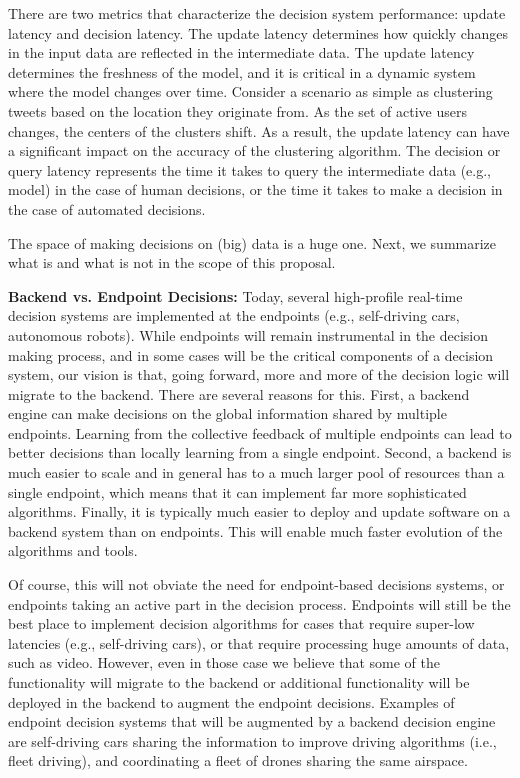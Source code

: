 There are two metrics that characterize the decision system performance: update latency and decision latency. The update latency determines how quickly changes in the input data are reflected in the intermediate data. The update latency determines the freshness of the model, and it is critical in a dynamic system where the model changes over time. Consider a scenario as simple as clustering tweets based on the location they originate from. As the set of active users changes, the centers of the clusters shift. As a result, the update latency can have a significant impact on the accuracy of the clustering algorithm. The decision or query latency represents the time it takes to query the intermediate data (e.g., model) in the case of human decisions, or the time it takes to make a decision in the case of automated decisions.


The space of making decisions on (big) data is a huge one. Next, we summarize what is and what is not in the scope of this proposal.

{\bf Backend vs. Endpoint Decisions:} Today, several high-profile real-time decision systems are implemented at the endpoints (e.g., self-driving cars, autonomous robots). While endpoints will remain instrumental in the decision making process, and in some cases will be the critical components of a decision system, our vision is that, going forward, more and more of the decision logic will migrate to the backend. There are several reasons for this. First, a backend engine can make decisions on the global information shared by multiple endpoints. Learning from the collective feedback of multiple endpoints can lead to better decisions than locally learning from a single endpoint. Second, a backend is much easier to scale and in general has to a much larger pool of resources than a single endpoint, which means that it can implement far more sophisticated algorithms. Finally, it is typically much easier to deploy and update software on a backend system than on endpoints. This will enable much faster evolution of the algorithms and tools.

Of course, this will not obviate the need for endpoint-based decisions systems, or endpoints taking an active part in the decision process. Endpoints will still be the best place to implement decision algorithms for cases that require super-low latencies (e.g., self-driving cars), or that require processing huge amounts of data, such as video. However, even in those case we believe that some of the functionality will migrate to the backend or additional functionality will be deployed in the backend to augment the endpoint decisions. Examples of endpoint decision systems that will be augmented by a backend decision engine are self-driving cars sharing the information to improve driving algorithms (i.e., fleet driving), and coordinating a fleet of drones sharing the same airspace.  

